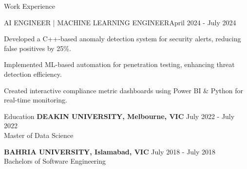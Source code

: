 \documentclass{resume} %
\begin{document}
    \begin{rSection}{Work Experience}
                    \begin{rSubsection}
                {AI ENGINEER | MACHINE LEARNING ENGINEER}{April 2024 - July 2024}
                                    {}
                                {}
                                    \item Developed a C++{-}based anomaly detection system for security alerts, reducing false positives by 25\%.
                                    \item Implemented ML{-}based automation for penetration testing, enhancing threat detection efficiency.
                                    \item Created interactive compliance metric dashboards using Power BI \& Python for real{-}time monitoring.
                            \end{rSubsection}
            \end{rSection}

\begin{rSection}{Education}
                        \textbf{DEAKIN UNIVERSITY, Melbourne, VIC} \hfill {July 2022 - July 2022} \\
                            {Master of Data Science}
                         
             
         
                        \textbf{BAHRIA UNIVERSITY, Islamabad, VIC} \hfill {July 2018 - July 2018} \\
                            {Bachelors of Software Engineering}
                         
             
         
    \end{rSection}
\end{document}
